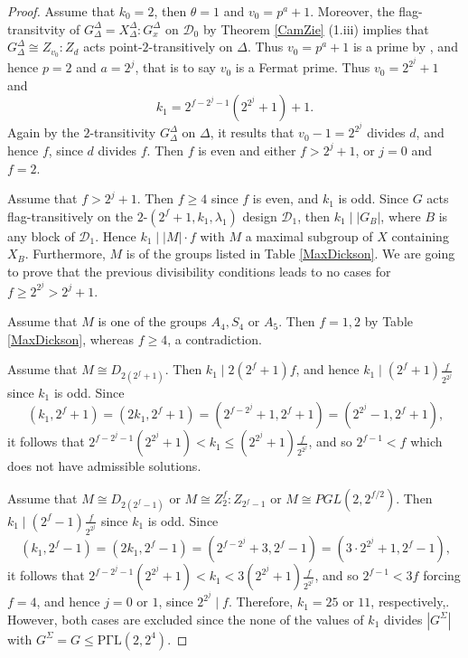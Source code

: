 \documentclass[a4paper,twopage,reqno,12pt]{amsart}
\theoremstyle{definition}
\numberwithin{equation}{section}
\newcommand{\PGaL}{\mathrm{P\Gamma L}}
\renewcommand{\leq}{\leqslant}
\renewcommand{\geq}{\geqslant}
\begin{document}
\begin{proof}
Assume that $k_{0}=2$, then $\theta =1$ and $v_{0}=p^{a}+1$. Moreover, the flag-transitvity of $G_{\Delta }^{\Delta }=X_{\Delta }^{\Delta }:G_{x}^{\Delta }$ 
on $\mathcal{D}_{0}$ by Theorem \ref{CamZie} (1.iii) implies that
$G_{\Delta }^{\Delta }\cong Z_{v_{0}}:Z_{d}$ 
acts point-$2$-transitively on $%
\Delta $. Thus $v_{0}=p^{a}+1$ is a prime by \cite[Theorem 4.1B]{DM}, and hence $p=2$ and $a=2^{j}$, that is to say $v_{0}$ is a Fermat prime. Thus $v_{0}=2^{2^{j}}+1$ and
$$k_{1}=2^{f-2^{j}-1}(2^{2^{j}}+1)+1\text{.}$$
Again by the $2$-transitivity $G_{\Delta }^{\Delta }$ on $\Delta$, it results that $v_{0}-1=2^{2^{j}}$ divides $d$, and hence $f$, since $d$ divides $f$. Then $f$ is even and either $f>2^{j}+1$, or $j=0$ and $f=2$.

Assume that $f> 2^{j}+1$. Then $f\geq 4$ since $f$ is even, and $k_{1}$ is odd. Since $G$ acts flag-transitively on the $2$-$(2^{f}+1,k_{1},\lambda_{1})$ design $\mathcal{D}_1$, then $k_{1}\mid \left\vert G_{B}\right\vert $, where $B$ is any block of $\mathcal{D}_1$. Hence $k_{1}\mid \left\vert M \right\vert \cdot f$ with $M$ a maximal subgroup of $X$ containing $X_{B}$. Furthermore, $M$ is of the groups listed in Table \ref{MaxDickson}. We are going to prove that the previous divisibility conditions leads to no cases for $f\geq 2^{2^{j}}> 2^{j}+1$. 

Assume that $M$ is one of the groups $A_{4},S_{4}$ or $A_{5}$. Then $f=1,2$ by Table \ref{MaxDickson}, whereas $f\geq 4$, a contradiction.

Assume that $M \cong D_{2(2^{f}+1)}$. Then $k_{1} \mid 2(2^{f}+1)f$, and hence $k_{1}\mid \left( 2^{f}+1\right)\frac{f}{2^{2^j}}$ since $k_{1}$ is odd. Since 
\begin{equation}\label{gcd1}
(k_{1},2^{f}+1)=(2k_{1},2^{f}+1)=(2^{f-2^{j}}+1,2^{f}+1)=(2^{2^{j}}-1,2^{f}+1)\text{,}   
\end{equation}
it follows that $2^{f-2^{j}-1}(2^{2^{j}}+1)<k_{1}\leq (2^{2^{j}}+1)\frac{f}{2^{2^j}}$, and so $2^{f-1}<f$ which does not have admissible solutions.

Assume that $M \cong D_{2(2^{f}-1)}$ or $M \cong Z_{2}^{f}:Z_{2^{f}-1}$ or $M \cong PGL(2,2^{f/2})$. Then $k_{1}\mid \left( 2^{f}-1\right)\frac{f}{2^{2^j}}$ since $k_{1}$ is odd. Since 
\begin{equation}\label{gcd2}
(k_{1},2^{f}-1)=(2k_{1},2^{f}-1)=(2^{f-2^{j}}+3,2^{f}-1)=(3\cdot 2^{2^{j}}+1,2^{f}-1)\text{,}
\end{equation}
it follows that $2^{f-2^{j}-1}(2^{2^{j}}+1)<k_{1}<3 (2^{2^{j}}+1)\frac{f}{2^{2^j}}$, and so $2^{f-1} < 3f$ forcing $f=4$, and hence $j=0$ or $1$, since $2^{2^j} \mid f$. Therefore, $k_1=25$ or $11$, respectively,. However, both cases are excluded since the none of the values of $k_{1}$ divides  $\left\vert G^{\Sigma
}\right\vert $ with $G^{\Sigma }=G\leq \PGaL(2,2^{4})$.


\end{proof}
\end{document}
